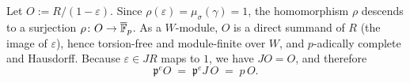 \begin{definition}
\label{def:local-factor}
\leanok
Let $O := R/(1 - \varepsilon)$. Since $\rho(\varepsilon) = \mu_\sigma(\gamma) = 1$, the
homomorphism $\rho$ descends to a surjection $\rho \colon O \to \overline{\mathbb{F}}_p$. As a
$W$-module, $O$ is a direct summand of $R$ (the image of $\varepsilon$), hence
torsion-free and module-finite over $W$, and $p$-adically complete and Hausdorff.
Because $\varepsilon \in JR$ maps to $1$, we have $JO = O$, and therefore
\[
  \mathfrak p^e O \;=\; \mathfrak p^e J\, O \;=\; p\,O.
\]
\end{definition}

